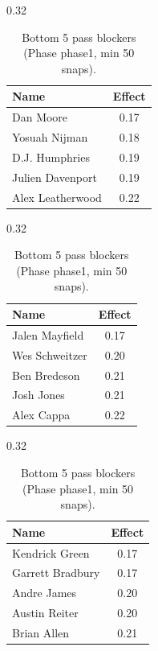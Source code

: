 \begin{table}[h!]
\centering
\begin{subtable}{0.32\textwidth}
\centering
\footnotesize
\begin{tabular}{lc}
\toprule
Name & Effect \\
\midrule
Dan Moore & 0.17 \\
Yosuah Nijman & 0.18 \\
D.J. Humphries & 0.19 \\
Julien Davenport & 0.19 \\
Alex Leatherwood & 0.22 \\
\bottomrule
\end{tabular}
\caption{T}
\end{subtable}
\hfill
\begin{subtable}{0.32\textwidth}
\centering
\footnotesize
\begin{tabular}{lc}
\toprule
Name & Effect \\
\midrule
Jalen Mayfield & 0.17 \\
Wes Schweitzer & 0.20 \\
Ben Bredeson & 0.21 \\
Josh Jones & 0.21 \\
Alex Cappa & 0.22 \\
\bottomrule
\end{tabular}
\caption{G}
\end{subtable}
\hfill
\begin{subtable}{0.32\textwidth}
\centering
\footnotesize
\begin{tabular}{lc}
\toprule
Name & Effect \\
\midrule
Kendrick Green & 0.17 \\
Garrett Bradbury & 0.17 \\
Andre James & 0.20 \\
Austin Reiter & 0.20 \\
Brian Allen & 0.21 \\
\bottomrule
\end{tabular}
\caption{C}
\end{subtable}
\caption{Bottom 5 pass blockers (Phase phase1, min 50 snaps).}
\label{tab:blocker_pm_phase1_bot}
\end{table}
